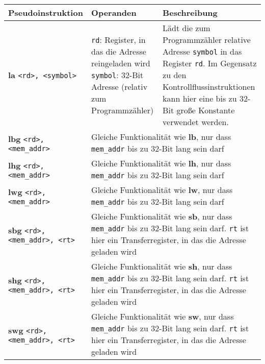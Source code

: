 \begin{tabular}{ p{4.8cm} p{5.0cm} p{5.0cm}}

	\textbf{Pseudoinstruktion} & \textbf{Operanden} & \textbf{Beschreibung}\\
  \toprule

	\textbf{la} \texttt{<rd>, <symbol>} &
	\textbullet \texttt{rd}: Register, in das die Adresse reingeladen wird \newline
	\textbullet \texttt{symbol}: 32-Bit Adresse (relativ zum Programmzähler)\footnotemark
	& Lädt die zum Programmzähler relative Adresse \texttt{symbol} in das Register \texttt{rd}. Im Gegensatz zu den Kontrollflussinstruktionen kann hier eine bis zu 32-Bit große Konstante verwendet werden.\\


	\textbf{lbg} \texttt{<rd>, <mem\_addr>} &
	\multicolumn{2}{|p{10cm}|}{Gleiche Funktionalität wie \textbf{lb}, nur dass \texttt{mem\_addr} bis zu 32-Bit lang sein darf}\\



	\textbf{lhg} \texttt{<rd>, <mem\_addr>} &
	\multicolumn{2}{|p{10cm}|}{Gleiche Funktionalität wie \textbf{lh}, nur dass \texttt{mem\_addr} bis zu 32-Bit lang sein darf}\\



	\textbf{lwg} \texttt{<rd>, <mem\_addr>} &
	\multicolumn{2}{|p{10cm}|}{Gleiche Funktionalität wie \textbf{lw}, nur dass \texttt{mem\_addr} bis zu 32-Bit lang sein darf}\\



	\textbf{sbg} \texttt{<rd>, <mem\_addr>, <rt>} &
	\multicolumn{2}{|p{10cm}|}{Gleiche Funktionalität wie \textbf{sb}, nur dass \texttt{mem\_addr} bis zu 32-Bit lang sein darf. \texttt{rt} ist hier ein Transferregister, in das die Adresse geladen wird}\\



	\textbf{shg} \texttt{<rd>, <mem\_addr>, <rt>} &
	\multicolumn{2}{|p{10cm}|}{Gleiche Funktionalität wie \textbf{sh}, nur dass \texttt{mem\_addr} bis zu 32-Bit lang sein darf. \texttt{rt} ist hier ein Transferregister, in das die Adresse geladen wird}\\



	\textbf{swg} \texttt{<rd>, <mem\_addr>, <rt>} &
	\multicolumn{2}{|p{10cm}|}{Gleiche Funktionalität wie \textbf{sw}, nur dass \texttt{mem\_addr} bis zu 32-Bit lang sein darf. \texttt{rt} ist hier ein Transferregister, in das die Adresse geladen wird}\\




\end{tabular}
